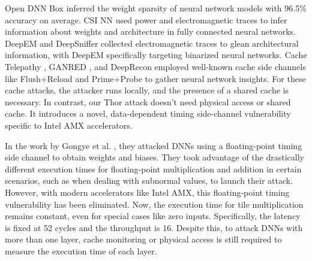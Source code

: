 Open DNN Box \cite{Xiang2019OpenDB} inferred the weight sparsity of neural network models with 96.5\% accuracy on average. CSI NN \cite{236204} used power and electromagnetic traces to infer information about weights and architecture in fully connected neural networks. DeepEM \cite{Yu2020DeepEMDN} and DeepSniffer \cite{Hu2020DeepSnifferAD} collected electromagnetic traces to glean architectural information, with DeepEM specifically targeting binarized neural networks. Cache Telepathy \cite{244042}, GANRED \cite{Liu2020GANREDGR}, and DeepRecon \cite{Hong2018SecurityAO} employed well-known cache side channels like Flush+Reload and Prime+Probe to gather neural network insights. For these cache attacks, the attacker runs locally, and the presence of a shared cache is necessary. In contrast, our Thor attack doesn't need physical access or shared cache. It introduces a novel, data-dependent timing side-channel vulnerability specific to Intel AMX accelerators.

In the work by Gongye et al. \cite{9218707}, they attacked DNNs using a floating-point timing side channel to obtain weights and biases. They took advantage of the drastically different execution times for floating-point multiplication and addition in certain scenarios, such as when dealing with subnormal values, to launch their attack. However, with modern accelerators like Intel AMX, this floating-point timing vulnerability has been eliminated. Now, the execution time for tile multiplication remains constant, even for special cases like zero inputs. Specifically, the latency is fixed at 52 cycles and the throughput is 16. Despite this, to attack DNNs with more than one layer, cache monitoring or physical access is still required to measure the execution time of each layer.





